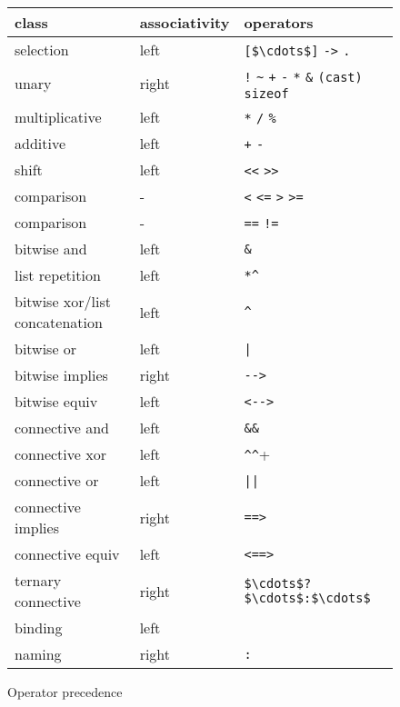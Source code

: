 \begin{figure}[t]
  \begin{center}
    \begin{tabular}{|l|l|l|}
      \hline
      class 	& associativity & operators \\
      \hline
      selection & left & \lstinline|[$\cdots$]| \lstinline|->| \lstinline|.| \\
      unary 	& right & \lstinline|!| \lstinline|~| \lstinline|+|
      \lstinline|-| \lstinline|*| \lstinline|&| \lstinline|(cast)|
      \lstinline|sizeof| \\
      multiplicative & left & \lstinline|*| \lstinline|/|  \lstinline|%| \\
      additive & left & \lstinline|+| \lstinline|-| \\
      shift 	& left & \lstinline|<<| \lstinline|>>| \\
      comparison & - & \lstinline|<| \lstinline|<=| \lstinline|>| \lstinline|>=| \\
      comparison & - & \lstinline|==| \lstinline|!=| \\
      bitwise and & left & \lstinline|&| \\
      list repetition & left & \lstinline|*^| \\
      bitwise xor/list concatenation & left & \lstinline|^| \\
      bitwise or & left & \lstinline+|+ \\
      bitwise implies & right & \lstinline+-->+ \\
      bitwise equiv & left & \lstinline+<-->+ \\
      connective and & left & \lstinline|&&| \\
      connective xor & left & \lstinline+^^+ \\
      connective or & left & \lstinline+||+ \\
      connective implies & right & \lstinline|==>| \\
      connective equiv & left & \lstinline|<==>| \\
      ternary connective & right & \lstinline|$\cdots$?$\cdots$:$\cdots$| \\
      binding & left & \Forall{} \Exists{} \Let{} \\
      naming & right & \lstinline|:| \\
      \hline
    \end{tabular}
  \end{center}
  \caption{Operator precedence}
\label{fig:precedence}
\end{figure}

